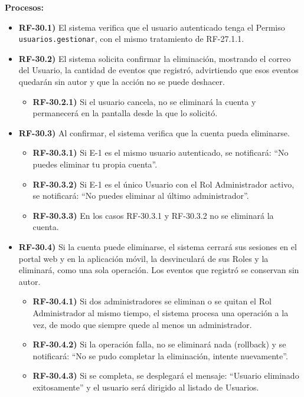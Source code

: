 \textbf{Procesos:}
\begin{itemize}[label={}, leftmargin=1.5em]
  \item \textbf{RF-30.1)} El sistema verifica que el usuario autenticado tenga el Permiso \texttt{usuarios.gestionar}, con el mismo tratamiento de RF-27.1.1.
  \item \textbf{RF-30.2)} El sistema solicita confirmar la eliminaci\'on, mostrando el correo del Usuario, la cantidad de eventos que registr\'o, advirtiendo que esos eventos quedar\'an sin autor y que la acci\'on no se puede deshacer.
  \begin{itemize}[label={}, leftmargin=1.5em]
    \item \textbf{RF-30.2.1)} Si el usuario cancela, no se eliminar\'a la cuenta y permanecer\'a en la pantalla desde la que lo solicit\'o.
  \end{itemize}
  \item \textbf{RF-30.3)} Al confirmar, el sistema verifica que la cuenta pueda eliminarse.
  \begin{itemize}[label={}, leftmargin=1.5em]
    \item \textbf{RF-30.3.1)} Si E-1 es el mismo usuario autenticado, se notificar\'a: ``No puedes eliminar tu propia cuenta''.
    \item \textbf{RF-30.3.2)} Si E-1 es el \'unico Usuario con el Rol Administrador activo, se notificar\'a: ``No puedes eliminar al \'ultimo administrador''.
    \item \textbf{RF-30.3.3)} En los casos RF-30.3.1 y RF-30.3.2 no se eliminar\'a la cuenta.
  \end{itemize}
  \item \textbf{RF-30.4)} Si la cuenta puede eliminarse, el sistema cerrar\'a sus sesiones en el portal web y en la aplicaci\'on m\'ovil, la desvincular\'a de sus Roles y la eliminar\'a, como una sola operaci\'on. Los eventos que registr\'o se conservan sin autor.
  \begin{itemize}[label={}, leftmargin=1.5em]
    \item \textbf{RF-30.4.1)} Si dos administradores se eliminan o se quitan el Rol Administrador al mismo tiempo, el sistema procesa una operaci\'on a la vez, de modo que siempre quede al menos un administrador.
    \item \textbf{RF-30.4.2)} Si la operaci\'on falla, no se eliminar\'a nada (rollback) y se notificar\'a: ``No se pudo completar la eliminaci\'on, intente nuevamente''.
    \item \textbf{RF-30.4.3)} Si se completa, se desplegar\'a el mensaje: ``Usuario eliminado exitosamente'' y el usuario ser\'a dirigido al listado de Usuarios.
  \end{itemize}
\end{itemize}

